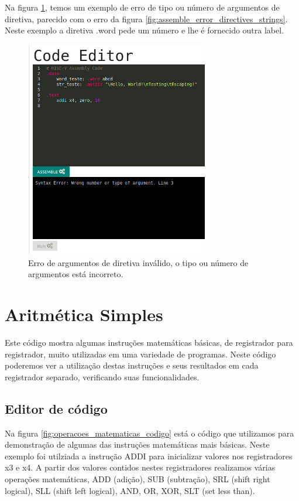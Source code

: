 	 Na figura \ref{fig:assemble_error_wrong_arguments}, temos um exemplo de erro de tipo ou número de argumentos de diretiva, parecido com o erro da figura \ref{fig:assemble_error_directives_strings}. Neste exemplo a diretiva .word pede um número e lhe é fornecido outra label.

	\begin{figure}[h!]
	  \centering
	  \includegraphics[width=8cm]{img/assemble_error_wrong_arguments.png}
	  \caption{Erro de argumentos de diretiva inválido, o tipo ou número de argumentos está incorreto.}
	  \label{fig:assemble_error_wrong_arguments}
	\end{figure}




\section{Aritmética Simples}
	
	Este código mostra algumas instruções matemáticas básicas, de registrador para registrador, muito utilizadas em uma variedade de programas. Neste código poderemos ver a utilização destas instruções e seus resultados em cada registrador separado, verificando suas funcionalidades.

\subsection{Editor de código}


	Na figura \ref{fig:operacoes_matematicas_codigo} está o código que utilizamos para demonstração de algumas das instruções matemáticas mais básicas. Neste exemplo foi utilziada a instrução ADDI para inicializar valores nos registradores x3 e x4. A partir dos valores contidos nestes registradores realizamos várias operações matemáticas, ADD (adição), SUB (subtração), SRL (shift right logical), SLL (shift left logical), AND, OR, XOR, SLT (set less than). 

